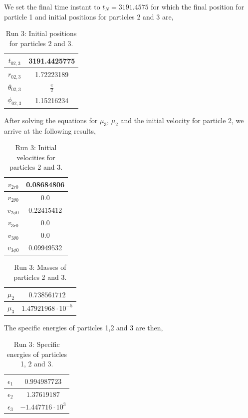 We set the final time instant to $t_{N}=3191.4575$ for which the final position for particle 1 and initial positions for particles 2 and 3 are,
\begin{table}[H]
	\centering
	\begin{tabular}{|c|c|}
		\hline
		$t_{02,3}$ & 3191.4425775 \\
		\hline
		$r_{02,3}$ & 1.72223189 \\
		\hline
		$\theta_{02,3}$ & $\frac{\pi}{2}$ \\
		\hline
		$\phi_{02,3}$ & 1.15216234 \\
		\hline
	\end{tabular}
	\caption[Run 3: Initial positions for particles 2 and 3]{Run 3: Initial positions for particles 2 and 3.}
	\label{tbl:RUN3_IC2}
\end{table}
After solving the equations for $\mu_3$, $\mu_2$ and the initial velocity for particle 2, we arrive at the following results,
\begin{table}[H]
	\centering
	\begin{tabular}{|c|c|}
		\hline
		$v_{2r0}$ & 0.08684806 \\
		\hline
		$v_{2\theta0}$ & 0.0 \\
		\hline
		$v_{2\phi0}$ & 0.22415412 \\
		\hline
		\hline
		$v_{3r0}$ & 0.0 \\
		\hline
		$v_{3\theta0}$ & 0.0 \\
		\hline
		$v_{3\phi0}$ & 0.09949532 \\
		\hline
	\end{tabular}
	\caption[Run 3: Initial velocities for particles 2 and 3]{Run 3: Initial velocities for particles 2 and 3.}
	\label{tbl:RUN3_IC3}
\end{table}
\begin{table}[H]
	\centering
	\begin{tabular}{|c|c|}
		\hline
		$\mu_2$ & $0.738561712$ \\
		\hline
		$\mu_3$ & $1.47921968 \cdot 10^{-5}$ \\
		\hline
	\end{tabular}
	\caption[Run 3: Masses of particles 2 and 3]{Run 3: Masses of particles 2 and 3.}
	\label{tbl:RUN3_IC4}
\end{table}

The specific energies of particles 1,2 and 3 are then,
\begin{table}[H]
	\centering
	\begin{tabular}{|c|c|}
		\hline
		$\epsilon_1$ & $0.994987723$ \\
		\hline
		$\epsilon_2$ & $1.37619187$ \\
		\hline
		$\epsilon_3$ & $-1.447716 \cdot 10^{3}$ \\
		\hline
	\end{tabular}
	\caption[Run 3: Specific energies of particles 1, 2 and 3]{Run 3: Specific energies of particles 1, 2 and 3.}
	\label{tbl:RUN3_IC5}
\end{table}

